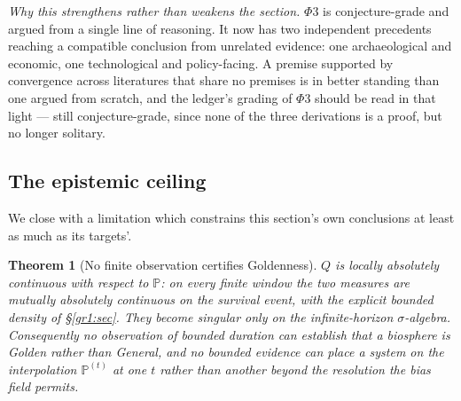 \documentclass[11pt]{article}
\numberwithin{equation}{section}
\theoremstyle{plain}
\newtheorem{theorem}{Theorem}[section]
\theoremstyle{definition}
\theoremstyle{remark}
\newcommand{\PP}{\mathbb{P}}
\begin{document}
\emph{Why this strengthens rather than weakens the section.} $\Phi3$ is
conjecture-grade and argued from a single line of reasoning. It now has
two independent precedents reaching a compatible conclusion from
unrelated evidence: one archaeological and economic, one
technological and policy-facing. A premise supported by convergence
across literatures that share no premises is in better standing than one
argued from scratch, and the ledger's grading of $\Phi3$ should be read
in that light --- still conjecture-grade, since none of the three
derivations is a proof, but no longer solitary.

\subsection{The epistemic ceiling}\label{gr:sub:ceiling}

We close with a limitation which constrains this section's own
conclusions at least as much as its targets'.

\begin{theorem}[No finite observation certifies Goldenness]
\label{gr:thm:ceiling}
$Q$ is locally absolutely continuous with respect to $\PP$: on every
finite window the two measures are mutually absolutely continuous on the
survival event, with the explicit bounded density of \S\ref{gr1:sec}. They
become singular only on the infinite-horizon $\sigma$-algebra.
Consequently no observation of bounded duration can establish that a
biosphere is Golden rather than General, and no bounded evidence can
place a system on the interpolation $\PP^{(t)}$ at one $t$ rather than
another beyond the resolution the bias field permits.
\end{theorem}
\end{document}
